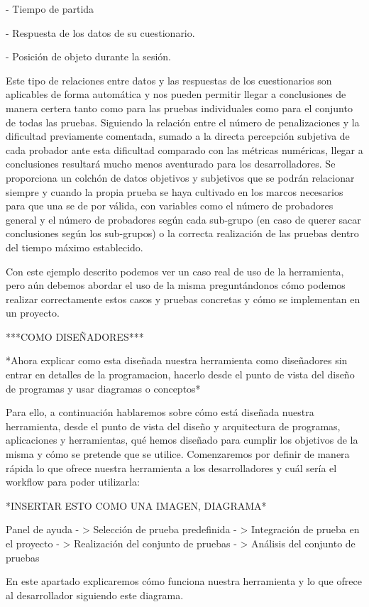 - Tiempo de partida

- Respuesta de los datos de su cuestionario.

- Posición de objeto durante la sesión.

Este tipo de relaciones entre datos y las respuestas de los cuestionarios son aplicables de forma automática y nos pueden permitir llegar a conclusiones de manera certera tanto como para las pruebas individuales como para el conjunto de todas las pruebas. Siguiendo la relación entre el número de penalizaciones y la dificultad previamente comentada, sumado a la directa percepción subjetiva de cada probador ante esta dificultad comparado con las métricas numéricas, llegar a conclusiones resultará mucho menos aventurado para los desarrolladores. Se proporciona un colchón de datos objetivos y subjetivos que se podrán relacionar siempre y cuando la propia prueba se haya cultivado en los marcos necesarios para que una se de por válida, con variables como el número de probadores general y el número de probadores según cada sub-grupo (en caso de querer sacar conclusiones según los sub-grupos) o la correcta realización de las pruebas dentro del tiempo máximo establecido.

Con este ejemplo descrito podemos ver un caso real de uso de la herramienta, pero aún debemos abordar el uso de la misma preguntándonos cómo podemos realizar correctamente estos casos y pruebas concretas y cómo se implementan en un proyecto.

***COMO DISEÑADORES***

*Ahora explicar como esta diseñada nuestra herramienta como diseñadores sin entrar en detalles de la programacion, hacerlo desde el punto de vista del diseño de programas y usar diagramas o conceptos*

Para ello, a continuación hablaremos sobre cómo está diseñada nuestra herramienta, desde el punto de vista del diseño y arquitectura de programas, aplicaciones y herramientas, qué hemos diseñado para cumplir los objetivos de la misma y cómo se pretende que se utilice. Comenzaremos por definir de manera rápida lo que ofrece nuestra herramienta a los desarrolladores y cuál sería el workflow para poder utilizarla:

*INSERTAR ESTO COMO UNA IMAGEN, DIAGRAMA* 

Panel de ayuda - > Selección de prueba predefinida - > Integración de prueba en el proyecto - > Realización del conjunto de pruebas - > Análisis del conjunto de pruebas

En este apartado explicaremos cómo funciona nuestra herramienta y lo que ofrece al desarrollador siguiendo este diagrama.

